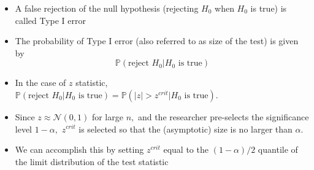\documentclass[notes=show]{beamer}
\begin{document}
\begin{frame}%


\begin{itemize}
\item A false rejection of the null hypothesis (rejecting $H_{0}$ when $%
H_{0} $ is true) is called Type I error

\item The probability of Type I error (also referred to as size of the test)
is given by%
\begin{equation*}
\mathbb{P}\left( \text{reject }H_{0}|H_{0}\text{ is true}\right)
\end{equation*}

\item In the case of $z$ statistic, $\mathbb{P}\left( \text{reject }%
H_{0}|H_{0}\text{ is true}\right) =\mathbb{P}\left( \left\vert z\right\vert
>z^{crit}|H_{0}\text{ is true}\right) .$

\item Since $z\approx \mathcal{N}\left( 0,1\right) $ for large $n,$ and the
researcher pre-selects the significance level $1-\alpha ,$ $z^{crit}$ is
selected so that the (asymptotic) size is no larger than $\alpha $.

\item We can accomplish this by setting $z^{crit}$ equal to the $\left(
1-\alpha \right) /2$ quantile of the limit distribution of the test statistic
\end{itemize}

\end{frame}%
\end{document}
